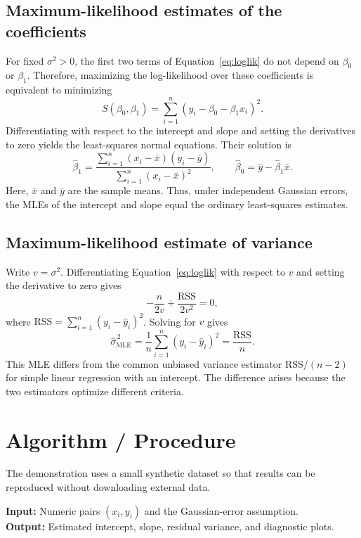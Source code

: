 \documentclass[11pt,a4paper]{article}
\begin{document}
\subsection{Maximum-likelihood estimates of the coefficients}
For fixed $\sigma^2>0$, the first two terms of Equation~\eqref{eq:loglik} do not depend on $\beta_0$ or $\beta_1$. Therefore, maximizing the log-likelihood over these coefficients is equivalent to minimizing
\begin{equation}
S(\beta_0,\beta_1)=\sum_{i=1}^{n}(y_i-\beta_0-\beta_1x_i)^2.
\label{eq:rss}
\end{equation}
Differentiating with respect to the intercept and slope and setting the derivatives to zero yields the least-squares normal equations. Their solution is
\begin{equation}
\widehat{\beta}_1=
\frac{\sum_{i=1}^{n}(x_i-\bar{x})(y_i-\bar{y})}
{\sum_{i=1}^{n}(x_i-\bar{x})^2},
\qquad
\widehat{\beta}_0=\bar{y}-\widehat{\beta}_1\bar{x}.
\label{eq:coeff}
\end{equation}
Here, $\bar{x}$ and $\bar{y}$ are the sample means. Thus, under independent Gaussian errors, the MLEs of the intercept and slope equal the ordinary least-squares estimates.

\subsection{Maximum-likelihood estimate of variance}
Write $v=\sigma^2$. Differentiating Equation~\eqref{eq:loglik} with respect to $v$ and setting the derivative to zero gives
\[
-\frac{n}{2v}+\frac{\mathrm{RSS}}{2v^2}=0,
\]
where $\mathrm{RSS}=\sum_{i=1}^{n}(y_i-\widehat{y}_i)^2$. Solving for $v$ gives
\begin{equation}
\boxed{\widehat{\sigma}^{\,2}_{\mathrm{MLE}}
=\frac{1}{n}\sum_{i=1}^{n}(y_i-\widehat{y}_i)^2
=\frac{\mathrm{RSS}}{n}.}
\label{eq:variance}
\end{equation}
This MLE differs from the common unbiased variance estimator $\mathrm{RSS}/(n-2)$ for simple linear regression with an intercept. The difference arises because the two estimators optimize different criteria.

\section{Algorithm / Procedure}
The demonstration uses a small synthetic dataset so that results can be reproduced without downloading external data.

\noindent\textbf{Input:} Numeric pairs $(x_i,y_i)$ and the Gaussian-error assumption.\\
\textbf{Output:} Estimated intercept, slope, residual variance, and diagnostic plots.
\end{document}
